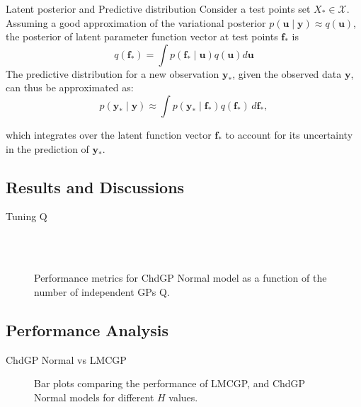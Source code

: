 \begin{frame}{Latent posterior and Predictive distribution}
	Consider a test points set $X_{*} \in \mathcal{X}$. Assuming a good approximation of the variational posterior $p(\mathbf{u} \mid \mathbf{y}) \approx q(\mathbf{u})$, the posterior of latent parameter function vector at test points $\mathbf{f}_*$ is
	\begin{equation*}
		q(\mathbf{f}_*) = \int p(\mathbf{f}_* \mid \mathbf{u}) q(\mathbf{u}) d\mathbf{u}
	\end{equation*}
	The predictive distribution for a new observation $\mathbf{y}_*$, given the observed data $\mathbf{y}$, can thus be approximated as:
	\begin{equation*}
		p(\mathbf{y}_* \mid \mathbf{y}) \approx \int p(\mathbf{y}_* \mid \mathbf{f}_*) q(\mathbf{f}_*) \, d\mathbf{f}_*,
	\end{equation*}
	
	which integrates over the latent function vector $\mathbf{f}_*$ to account for its uncertainty in the prediction of $\mathbf{y}_*$.

\end{frame}

\subsection{Results and Discussions}

\begin{frame}{Tuning Q}
	\begin{figure}[htbp]
		\centering
		\setlength{} 
		\setlength{}
		\subfloat[CRPS]{}
		\subfloat[MSE]{}\\
		\vspace{-0.2cm}
		\subfloat[MSLL]{}
		\subfloat[NLPD]{}\\
		\vspace{-0.5cm}
		\caption{Performance metrics for ChdGP Normal model as a function of the number of independent GPs Q.}
	\end{figure}
\end{frame}

\subsection{Performance Analysis}
\begin{frame}{ChdGP Normal vs LMCGP}
	\begin{figure}[htbp]
		\centering
		\setlength{}
		\setlength{}
		
		\subfloat[NLPD]{}
		\hfill
		\subfloat[MSLL]{}
		
		\caption{Bar plots comparing the performance of LMCGP, and ChdGP Normal models for different \(H\) values.}
	\end{figure}
\end{frame}

